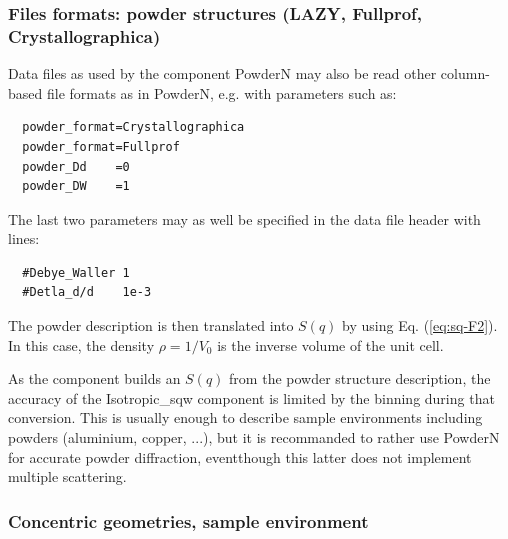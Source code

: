 \subsubsection{Files formats: powder structures (LAZY, Fullprof, Crystallographica)}

Data files as used by the component PowderN may also be read other column-based file formats as in PowderN, e.g. with parameters such as:
\begin{verbatim}
  powder_format=Crystallographica
  powder_format=Fullprof
  powder_Dd    =0
  powder_DW    =1
\end{verbatim}
The last two parameters may as well be specified in the data file header with lines:
\begin{verbatim}
  #Debye_Waller 1
  #Detla_d/d    1e-3
\end{verbatim}
The powder description is then translated into $S(q)$ by using Eq. (\ref{eq:sq-F2}).
In this case, the density $\rho = 1/V_0$ is the inverse volume of the unit cell.

As the component builds an $S(q)$ from the powder structure description, the accuracy of the Isotropic\_sqw component is limited by the binning during that conversion. This is usually enough to describe sample environments including powders (aluminium, copper, ...), but it is recommanded to rather use PowderN for accurate powder diffraction, eventthough this latter does not implement multiple scattering.

\subsubsection{Concentric geometries, sample environment}

